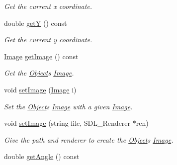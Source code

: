 \begin{DoxyCompactItemize}
\begin{DoxyCompactList}\small\item\em Get the current x coordinate. \end{DoxyCompactList}\item 
double \hyperlink{classObject_a5c85757552e0dc8a69baf769540cc612}{getY} () const \hypertarget{classObject_a5c85757552e0dc8a69baf769540cc612}{}\label{classObject_a5c85757552e0dc8a69baf769540cc612}

\begin{DoxyCompactList}\small\item\em Get the current y coordinate. \end{DoxyCompactList}\item 
\hyperlink{classImage}{Image} \hyperlink{classObject_a76748c591087e0a3c676daea6f257e08}{get\+Image} () const \hypertarget{classObject_a76748c591087e0a3c676daea6f257e08}{}\label{classObject_a76748c591087e0a3c676daea6f257e08}

\begin{DoxyCompactList}\small\item\em Get the \hyperlink{classObject}{Object}\textquotesingle{}s \hyperlink{classImage}{Image}. \end{DoxyCompactList}\item 
void \hyperlink{classObject_a131f81446cda68e47ee7e94d247e6ea1}{set\+Image} (\hyperlink{classImage}{Image} i)\hypertarget{classObject_a131f81446cda68e47ee7e94d247e6ea1}{}\label{classObject_a131f81446cda68e47ee7e94d247e6ea1}

\begin{DoxyCompactList}\small\item\em Set the \hyperlink{classObject}{Object}\textquotesingle{}s \hyperlink{classImage}{Image} with a given \hyperlink{classImage}{Image}. \end{DoxyCompactList}\item 
void \hyperlink{classObject_a7f984ff2fb0c60b942a1018fc48417ae}{set\+Image} (string file, S\+D\+L\+\_\+\+Renderer $\ast$ren)\hypertarget{classObject_a7f984ff2fb0c60b942a1018fc48417ae}{}\label{classObject_a7f984ff2fb0c60b942a1018fc48417ae}

\begin{DoxyCompactList}\small\item\em Give the path and renderer to create the \hyperlink{classObject}{Object}\textquotesingle{}s \hyperlink{classImage}{Image}. \end{DoxyCompactList}\item 
double \hyperlink{classObject_aaba7ccef31e74246abda5ef9cb2e202c}{get\+Angle} () const \hypertarget{classObject_aaba7ccef31e74246abda5ef9cb2e202c}{}\label{classObject_aaba7ccef31e74246abda5ef9cb2e202c}


\end{DoxyCompactItemize}
